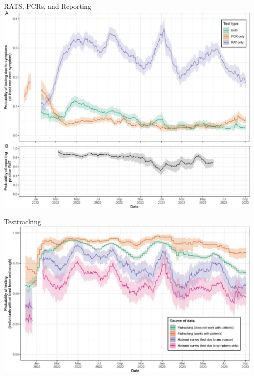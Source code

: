 \documentclass[
  ignorenonframetext,
  aspectratio=149,
]{beamer}
\begin{document}
\begin{frame}{RATS, PCRs, and Reporting}
\label{rats-pcrs-and-reporting}
\includegraphics{images/eales_F4.large.jpg}
\end{frame}

\begin{frame}{Testtracking}
\label{testtracking}
\includegraphics{images/eales_F5.large.jpg}
\end{frame}
\end{document}
